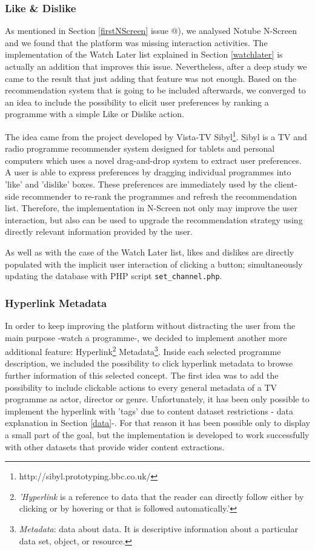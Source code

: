 \documentclass{acm_proc_article-sp}
\makeatletter
\newcommand*{\rom}[1]{\expandafter\@slowromancap\romannumeral #1@}
\makeatother
\begin{document}
\subsubsection{Like \& Dislike}
As mentioned in Section \ref{firstNScreen} issue \rom{3}), we analysed Notube N-Screen and we found that the platform was missing interaction activities. The implementation of the Watch Later list explained in Section \ref{watchlater} is  actually an addition that improves this issue. Nevertheless, after a deep study we came to the result that just adding that feature was not enough. Based on the recommendation system that is going to be included afterwards, we converged to an idea to include the possibility to elicit user preferences by ranking a programme with a simple Like or Dislike action. 

The idea came from the project developed by Vista-TV Sibyl\footnote{http://sibyl.prototyping.bbc.co.uk/}. Sibyl is a TV and radio programme recommender system designed for tablets and personal computers which uses a novel drag-and-drop system to extract user preferences. A user is able to express preferences by dragging individual programmes into 'like' and 'dislike' boxes. These preferences are immediately used by the client-side recommender to re-rank the programmes and refresh the recommendation list. Therefore, the implementation in N-Screen not only may improve the user interaction, but also can be used to upgrade the recommendation strategy using directly relevant information provided by the user. 

As well as with the case of the Watch Later list, likes and dislikes are directly populated with the implicit user interaction of clicking a button; simultaneously updating the database with PHP script \texttt{set\_channel.php}. 

\subsubsection{Hyperlink Metadata}

In order to keep improving the platform without distracting the user from the main purpose\cite{allen2012smashing} -watch a programme-, we decided to implement another more additional feature: Hyperlink\cite{wiki:hyper}\footnote{\textit{'Hyperlink} is a reference to data that the reader can directly follow either by clicking or by hovering or that is followed automatically.'} Metadata\footnote{\textit{Metadata}: data about data. It is descriptive information about a particular data set, object, or resource.}. Inside each selected programme description, we included the possibility to click hyperlink metadata to browse further information of this selected concept. The first idea was to add the possibility to include clickable actions to every general metadata of a TV programme as actor, director or genre. Unfortunately, it has been only possible to implement the hyperlink with 'tags'  due to content dataset restrictions - data explanation in Section \ref{data}-. For that reason it has been possible only to display a small part of the goal, but the implementation is developed to work successfully with other datasets that provide wider content extractions.
\end{document}
